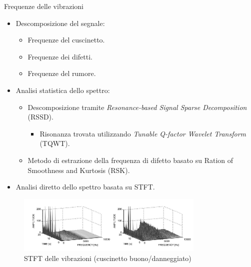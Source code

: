 \documentclass{beamer}
\begin{document}
\begin{frame}[allowframebreaks]{Frequenze delle vibrazioni}
    \begin{itemize}
        \item Descomposizione del segnale\cite{tang2019fault}:
        \begin{itemize}
            \item Frequenze del cuscinetto.
            \item Frequenze dei difetti.
            \item Frequenze del rumore.
        \end{itemize}
        \item Analisi statistica dello spettro\cite{xue2022fault}:
        \begin{itemize}
            \item Descomposizione tramite \textit{Resonance-based Signal Sparse Decomposition} (RSSD).
            \begin{itemize}
                \item Risonanza trovata utilizzando \textit{Tunable Q-factor Wavelet Transform} (TQWT).
            \end{itemize}
            \item Metodo di estrazione della frequenza di difetto basato su Ration of Smoothness and Kurtosis (RSK).
        \end{itemize}
        \framebreak
        \item Analisi diretto dello spettro basata su STFT\cite{rubio2012experimental}.
    \end{itemize}
    
    \begin{figure}
        \centering
        \includegraphics[width=0.8\textwidth]{Figures/STFT.png}
        \caption{STFT delle vibrazioni (cuscinetto buono/danneggiato)}
        \label{fig:STFT}
    \end{figure}
\end{frame}
\end{document}
